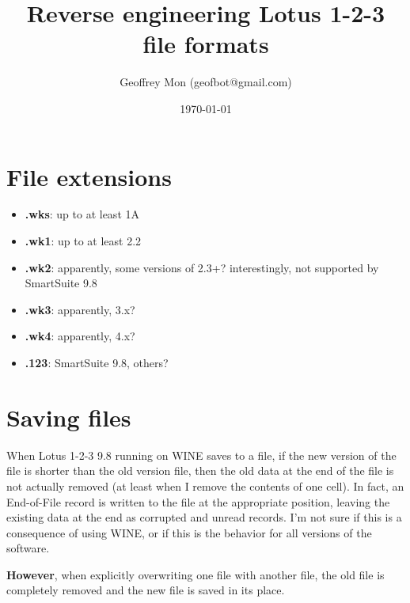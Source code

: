 \documentclass{article}
\title{Reverse engineering Lotus 1-2-3 file formats}
\author{Geoffrey Mon (geofbot@gmail.com)}
\date{\today}
\begin{document}
\maketitle

\section{File extensions}
\begin{itemize}
\item \textbf{.wks}: up to at least 1A
\item \textbf{.wk1}: up to at least 2.2
\item \textbf{.wk2}: apparently, some versions of 2.3+?
  interestingly, not supported by SmartSuite 9.8
\item \textbf{.wk3}: apparently, 3.x?
\item \textbf{.wk4}: apparently, 4.x?
\item \textbf{.123}: SmartSuite 9.8, others?
\end{itemize}

\section{Saving files}
When Lotus 1-2-3 9.8 running on WINE saves to a file, if
the new version of the file is shorter
than the old version file, then the old
data at the end of the file is not actually removed
(at least when I remove the contents of one cell).
In fact, an End-of-File record is written to the file at the
appropriate position, leaving the existing data at the end
as corrupted and unread records.
I'm not sure if this is a consequence of using WINE,
or if this is the behavior for all versions of the software.

\textbf{However}, when explicitly overwriting one file with
another file, the old file is completely removed and
the new file is saved in its place.
\end{document}
